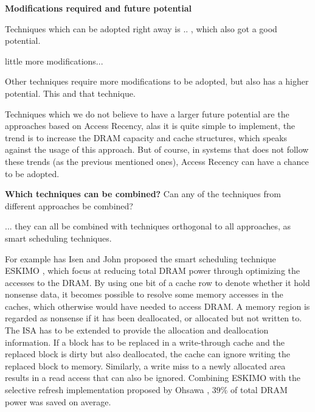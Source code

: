 \textbf{Modifications required and future potential}

Techniques which can be adopted right away is .. , which also got a good potential.

little more modifications...

Other techniques require more modifications to be adopted, but also has a higher potential. This and that technique.

Techniques which we do not believe to have a larger future potential are the approaches based on Access Recency, alas it is quite simple to implement, the trend is to increase the DRAM capacity and cache structures, which speaks against the usage of this approach. But of course, in systems that does not follow these trends (as the previous mentioned ones), Access Recency can have a chance to be adopted. 


\textbf{Which techniques can be combined?}
Can any of the techniques from different approaches be combined?

... they can all be combined with techniques orthogonal to all approaches, as smart scheduling techniques.

For example has Isen and John proposed the smart scheduling technique ESKIMO \cite{eskimo}, which focus at reducing total DRAM power through optimizing the accesses to the DRAM. By using one bit of a cache row to denote whether it hold nonsense data, it becomes possible to resolve some memory accesses in the caches, which otherwise would have needed to access DRAM. A memory region is regarded as nonsense if it has been deallocated, or allocated but not written to. The ISA has to be extended to provide the allocation and deallocation information. If a block has to be replaced in a write-through cache and the replaced block is dirty but also deallocated, the cache can ignore writing the replaced block to memory. Similarly, a write miss to a newly allocated area results in a read access that can also be ignored. Combining ESKIMO with the selective refresh implementation proposed by Ohsawa \cite{ohsawa}, $39\%$ of total DRAM power was saved on average.